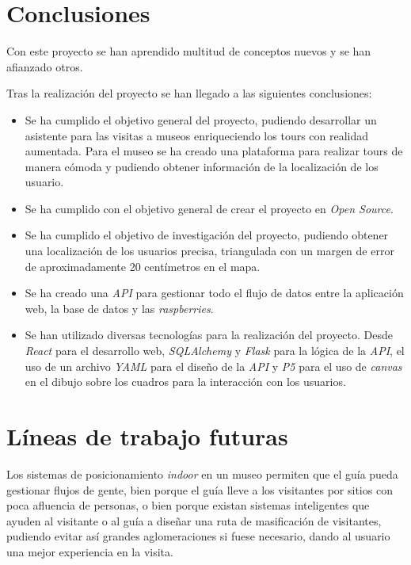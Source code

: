 
\section{Conclusiones}
Con este proyecto se han aprendido multitud de conceptos nuevos y se han afianzado otros.

Tras la realización del proyecto se han llegado a las siguientes conclusiones:
\begin{itemize}
    \item Se ha cumplido el objetivo general del proyecto, pudiendo desarrollar un asistente para las visitas a museos enriqueciendo los tours con realidad aumentada. Para el museo se ha creado una plataforma para realizar tours de manera cómoda y pudiendo obtener información de la localización de los usuario.
    \item Se ha cumplido con el objetivo general de crear el proyecto en \textit{Open Source}.
    \item Se ha cumplido el objetivo de investigación del proyecto, pudiendo obtener una localización de los usuarios precisa, triangulada con un margen de error de aproximadamente 20 centímetros en el mapa.
    \item Se ha creado una \textit{API} para gestionar todo el flujo de datos entre la aplicación web, la base de datos y las \textit{raspberries}.
    \item Se han utilizado diversas tecnologías para la realización del proyecto. Desde \textit{React} para el desarrollo web, \textit{SQLAlchemy} y \textit{Flask} para la lógica de la \textit{API}, el uso de un archivo \textit{YAML} para el diseño de la \textit{API} y \textit{P5} para el uso de \textit{canvas} en el dibujo sobre los cuadros para la interacción con los usuarios.
\end{itemize}

\section{Líneas de trabajo futuras}
Los sistemas de posicionamiento \textit{indoor} en un museo permiten que el guía pueda gestionar flujos de gente, bien porque el guía lleve a los visitantes por sitios con poca afluencia de personas, o bien porque existan sistemas inteligentes que ayuden al visitante o al guía a diseñar una ruta de masificación de visitantes, pudiendo evitar así grandes aglomeraciones si fuese necesario, dando al usuario una mejor experiencia en la visita.

